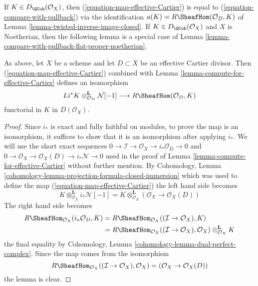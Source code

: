 \medskip\noindent
If $K \in D_\QCoh(\mathcal{O}_X)$, then
(\ref{equation-map-effective-Cartier}) is equal to
(\ref{equation-compare-with-pullback}) via the identification
$a(K) = R\SheafHom(\mathcal{O}_D, K)$ of
Lemma \ref{lemma-twisted-inverse-image-closed}.
If $K \in D_\QCoh(\mathcal{O}_X)$ and $X$ is Noetherian, then
the following lemma is a special case of
Lemma \ref{lemma-compare-with-pullback-flat-proper-noetherian}.

\begin{lemma}
\label{lemma-sheaf-with-exact-support-effective-Cartier}
As above, let $X$ be a scheme and let $D \subset X$ be an
effective Cartier divisor. Then (\ref{equation-map-effective-Cartier})
combined with Lemma \ref{lemma-compute-for-effective-Cartier}
defines an isomorphism
$$
Li^*K \otimes_{\mathcal{O}_D}^\mathbf{L} \mathcal{N}[-1]
\longrightarrow
R\SheafHom(\mathcal{O}_D, K)
$$
functorial in $K$ in $D(\mathcal{O}_X)$.
\end{lemma}

\begin{proof}
Since $i_*$ is exact and fully faithful on modules, to prove the map is an
isomorphism, it suffices to show that it is an isomorphism after applying
$i_*$. We will use the short exact sequences
$0 \to \mathcal{I} \to \mathcal{O}_X \to i_*\mathcal{O}_D \to 0$
and
$0 \to \mathcal{O}_X \to \mathcal{O}_X(D) \to i_*\mathcal{N} \to 0$
used in the proof of Lemma \ref{lemma-compute-for-effective-Cartier}
without further mention. By
Cohomology, Lemma \ref{cohomology-lemma-projection-formula-closed-immersion}
which was used to define the map (\ref{equation-map-effective-Cartier})
the left hand side becomes
$$
K \otimes_{\mathcal{O}_X}^\mathbf{L} i_*\mathcal{N}[-1] =
K \otimes_{\mathcal{O}_X}^\mathbf{L} (\mathcal{O}_X \to \mathcal{O}_X(D))
$$
The right hand side becomes
\begin{align*}
R\SheafHom_{\mathcal{O}_X}(i_*\mathcal{O}_D, K) & =
R\SheafHom_{\mathcal{O}_X}((\mathcal{I} \to \mathcal{O}_X), K) \\
& =
R\SheafHom_{\mathcal{O}_X}((\mathcal{I} \to \mathcal{O}_X), \mathcal{O}_X)
\otimes_{\mathcal{O}_X}^\mathbf{L} K
\end{align*}
the final equality by
Cohomology, Lemma \ref{cohomology-lemma-dual-perfect-complex}.
Since the map comes from the isomorphism
$$
R\SheafHom_{\mathcal{O}_X}((\mathcal{I} \to \mathcal{O}_X), \mathcal{O}_X)
= (\mathcal{O}_X \to \mathcal{O}_X(D))
$$
the lemma is clear.
\end{proof}

